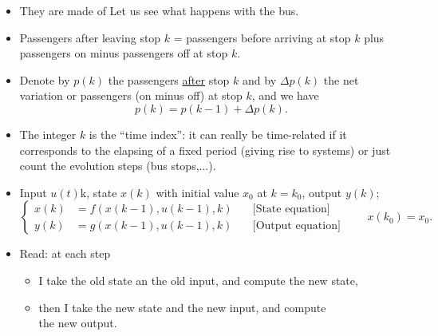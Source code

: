 \begin{frame}
\myPause
 \begin{itemize}[<+-| alert@+>]
 \item They are made of  Let us see what happens with the bus.
 \item Passengers after leaving stop $k$ = passengers before arriving at stop $k$ plus passengers on
       minus passengers off at stop $k$.
 \item Denote by $p(k)$ the passengers \underline{after} stop $k$ and by $\Delta p(k)$ the net variation
       or passengers (on minus off) at stop $k$, and we have
       \begin{displaymath}
        p(k) = p(k-1)+\Delta p(k).
       \end{displaymath}
 \end{itemize}
\end{frame}

\begin{frame}
\myPause
 \begin{itemize}[<+-| alert@+>]
 \item The integer $k$ is the ``time index'': it can really be time-related if it corresponds to the elapsing
       of a fixed period (giving rise to  systems) or just count the evolution steps (bus stops,...).
 \item Input $u(t)$k, state $x(k)$ with initial value $x_0$ at $k=k_0$, output $y(k)$;
       \begin{displaymath}
        \left\{\begin{array}{rll}
         x(k) &= f\left(x(k-1),u(k-1),k\right) &\quad \text{[State equation]} \\
         y(k) &= g\left(x(k-1),u(k-1),k\right) &\quad \text{[Output equation]}
        \end{array}\right. \qquad
        x(k_0) = x_0.
       \end{displaymath}
 \item Read: at each step
       \begin{itemize}[<+-| alert@+>]
       \item I take the old state an the old input, and compute the new state,
       \item then I take the new state and the new input, and compute\\
             the new output.
       \end{itemize}
 \end{itemize}
\end{frame}


